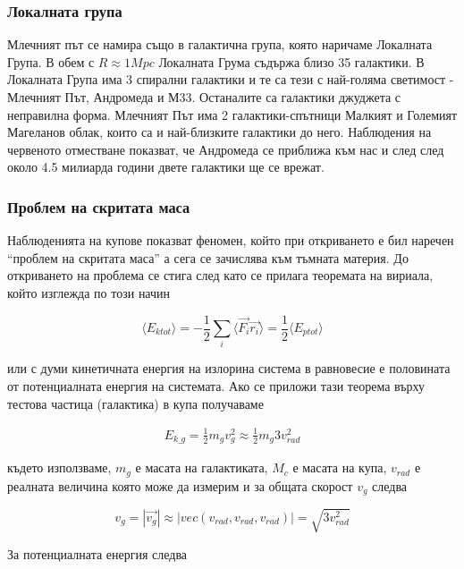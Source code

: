 \documentclass[a4paper,12pt]{article}
\begin{document}
 \subsubsection{Локалната група}
 Млечният път се намира също в галактична група, която наричаме Локалната Група. В обем с $R \approx 1Mpc$ Локалната Грума съдържа близо 35 галактики. В Локалната Група има 3 спирални галактики и те са тези с най-голяма светимост - Млечният Път, Андромеда и М33. Останалите са галактики джуджета с неправилна форма. Млечният Път има 2 галактики-спътници Малкият и Големият Магеланов облак, които са и най-близките галактики до него. Наблюдения на червеното отместване показват, че Андромеда се приближа към нас и след след около 4.5 милиарда години двете галактики ще се врежат.
 
 
 \subsubsection{Проблем на скритата маса}
 Наблюденията на купове показват феномен, който при откриването е бил наречен ``проблем на скритата маса'' а сега се зачислява към тъмната материя. До откриването на проблема се стига след като се прилага теоремата на вириала, който изглежда по този начин
 
 \begin{equation}
     \big \langle E_{ktot} \big \rangle = -\frac{1}{2} \sum_{i} \big \langle \Vec{F_i} \Vec{r_i} \big \rangle = \frac{1}{2} \big \langle E_{ptot} \big \rangle
 \label{eq:virial}
 \end{equation}
 
 или с думи кинетичната енергия на излорина система в равновесие е половината от потенциалната енергия на системата. Ако се приложи тази теорема върху тестова частица (галактика) в купа получаваме
 
 \begin{gather}
     E_{k\_g} = \frac{1}{2} m_g v_g^2 \approx  \frac{1}{2} m_g 3 v_{rad} ^2
 \end{gather}
 
 където използваме, $m_g$ е масата на галактиката, $M_c$ е масата на купа, $v_{rad}$ е реалната величина която може да измерим и за общата скорост $v_g$ следва
 
 \begin{equation}
     v_g = |\Vec{v_g}| \approx  \left | vec({v_{rad}}, {v_{rad}}, {v_{rad}}) \right | = \sqrt{3 v_{rad}^2}
 \end{equation}
 
 
 За потенциалната енергия следва
 
\end{document}
